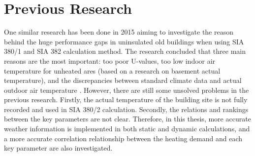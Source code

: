 		

	\section{Previous Research}
		 One similar research has been done in 2015 aiming to investigate the reason behind the huge performance gaps in uninsulated old buildings when using SIA 380/1 and SIA 382 calculation method. The research concluded that three main reasons are the most important: too poor U-values, too low indoor air temperature for unheated ares (based on a research on basement actual temperature), and the discrepancies between standard climate data and actual outdoor air temperature \cite{SIAPreviousreport}. However, there are still some unsolved problems in the previous research. Firstly, the actual temperature of the building site is not fully recorded and used in SIA 380/2 calculation. Secondly, the relations and rankings between the key parameters are not clear. Therefore, in this thesis, more accurate weather information is implemented in both static and dynamic calculations, and a more accurate correlation relationship between the heating demand and each key parameter are also investigated.

